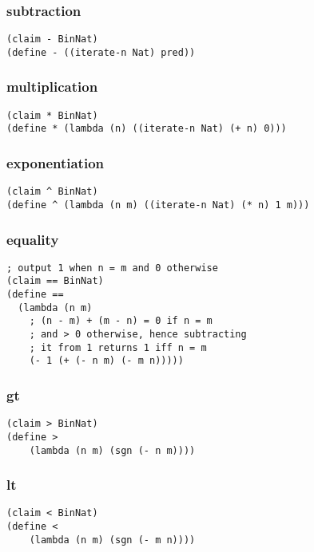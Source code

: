 \subsubsection{subtraction} \label{code:subtraction}
\begin{verbatim}
(claim - BinNat)
(define - ((iterate-n Nat) pred))
\end{verbatim}

\subsubsection{multiplication} \label{code:multiplication}
\begin{verbatim}
(claim * BinNat)
(define * (lambda (n) ((iterate-n Nat) (+ n) 0)))
\end{verbatim}

\subsubsection{exponentiation} \label{code:exponentiation}
\begin{verbatim}
(claim ^ BinNat)
(define ^ (lambda (n m) ((iterate-n Nat) (* n) 1 m)))
\end{verbatim}

\subsubsection{equality} \label{code:equality}
\begin{verbatim}
; output 1 when n = m and 0 otherwise
(claim == BinNat)
(define ==
  (lambda (n m)
    ; (n - m) + (m - n) = 0 if n = m
    ; and > 0 otherwise, hence subtracting
    ; it from 1 returns 1 iff n = m
    (- 1 (+ (- n m) (- m n)))))
\end{verbatim}

\subsubsection{gt} \label{code:gt}
\begin{verbatim}
(claim > BinNat)
(define >
    (lambda (n m) (sgn (- n m))))
\end{verbatim}

\subsubsection{lt} \label{code:lt}
\begin{verbatim}
(claim < BinNat)
(define <
    (lambda (n m) (sgn (- m n))))
\end{verbatim}

